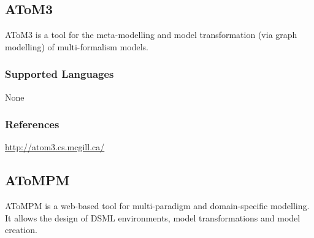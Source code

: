 \subsection{AToM3}
\label{subsecT:AToM3}

AToM3 is a tool for the meta-modelling and model transformation (via graph modelling) of multi-formalism models.



\subsubsection{Supported Languages}

None


\subsubsection{References}

\url{http://atom3.cs.mcgill.ca/}


\subsection{AToMPM}
\label{subsecT:AToMPM}


AToMPM is a web-based tool for multi-paradigm and domain-specific modelling.
It allows the design of DSML environments, model transformations and model creation.




